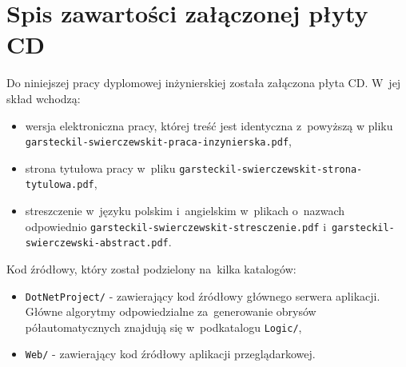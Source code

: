 \documentclass[a4paper,11pt,twoside,openright]{report}
\newcommand\blankpage{%
    \null
    \thispagestyle{empty}%
    \newpage}
\theoremstyle{definition}
\begin{document}


\afterpage{\blankpage}

\listoffigures
{}


\afterpage{\blankpage}




\chapter*{Spis zawartości załączonej płyty CD}

Do niniejszej pracy dyplomowej inżynierskiej została załączona płyta CD. W~jej skład wchodzą:
\begin{itemize}[noitemsep]
\item wersja elektroniczna pracy, której treść jest identyczna z~powyższą w
pliku \verb+garsteckil-swierczewskit-praca-inzynierska.pdf+,
\item strona tytułowa pracy w~pliku \verb+garsteckil-swierczewskit-strona-tytulowa.pdf+,
\item streszczenie w~języku polskim i~angielskim w~plikach o~nazwach odpowiednio
\verb+garsteckil-swierczewskit-stresczenie.pdf+ i~\verb+garsteckil-swierczewski-abstract.pdf+.
\end{itemize}

Kod źródłowy, który został podzielony na~kilka katalogów:
\begin{itemize}
\item \verb+DotNetProject/+ - zawierający kod źródłowy głównego serwera aplikacji.
Główne algorytmy odpowiedzialne za~generowanie obrysów półautomatycznych znajdują się w~podkatalogu \verb+Logic/+,
\item \verb+Web/+ - zawierający kod źródłowy aplikacji przeglądarkowej.
\end{itemize}

\afterpage{\blankpage}

\end{document}
